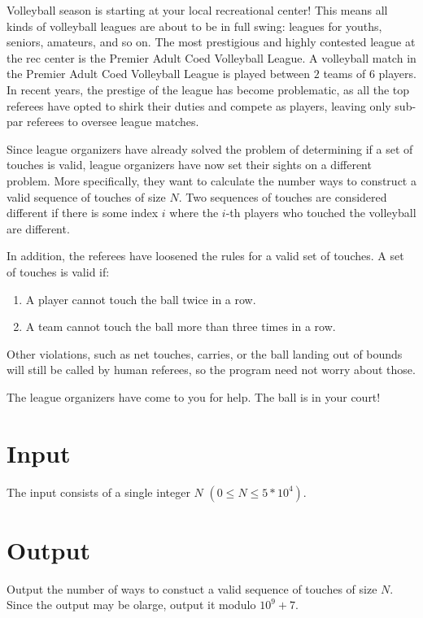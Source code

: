 
Volleyball season is starting at your local recreational center! This means all kinds of volleyball
leagues are about to be in full swing: leagues for youths, seniors, amateurs, and so on. The most
prestigious and highly contested league at the rec center is the Premier Adult Coed Volleyball
League. A volleyball match in the Premier Adult Coed Volleyball League is played between $2$ teams of
$6$ players. In recent years, the prestige of the league has become problematic, as all the top referees
have opted to shirk their duties and compete as players, leaving only sub-par referees to oversee
league matches.

Since league organizers have already solved the problem of determining if a set of touches is valid, 
league organizers have now set their sights on a different problem. More specifically, they want to 
calculate the number ways to construct a valid sequence of touches of size $N$. Two sequences of touches 
are considered different if there is some index $i$ where the $i$-th players who touched the 
volleyball are different.

In addition, the referees have loosened the rules for a valid set of touches.
A set of touches is valid if:

\begin{enumerate}
    \item A player cannot touch the ball twice in a row.
    \item A team cannot touch the ball more than three times in a row.
\end{enumerate}

Other violations, such as net touches, carries, or the ball landing out of bounds will still be called
by human referees, so the program need not worry about those.

The league organizers have come to you for help. The ball is in your court!

\section*{Input}

The input consists of a single integer $N$ $(0 \leq N \leq 5 * 10^4)$.

\section*{Output}

Output the number of ways to constuct a valid sequence of touches of size $N$. Since the output may be
olarge, output it modulo $10^9 + 7$.
